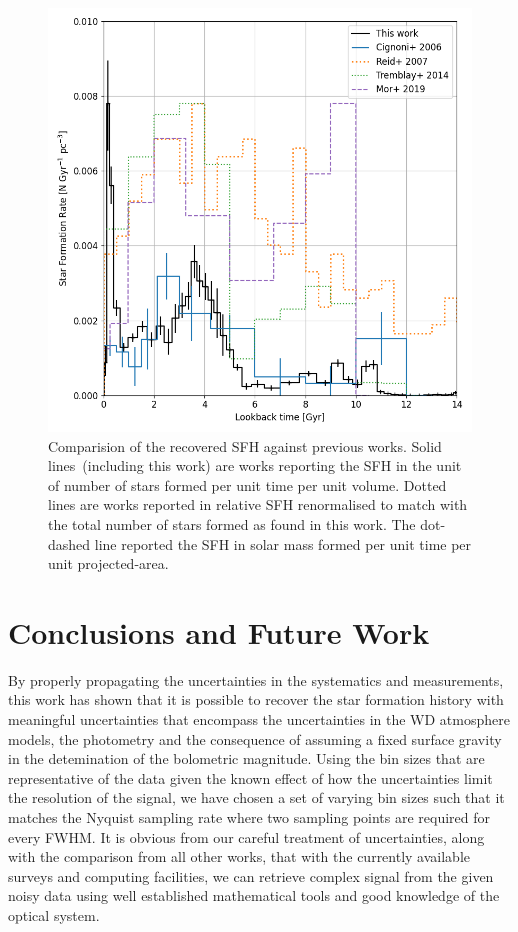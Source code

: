 \documentclass[fleqn,usenatbib]{mnras}
\begin{document}
\begin{figure}
  \includegraphics[width=\columnwidth]{figures/fig_06_compare_sfh.png}
  \caption{Comparision of the recovered SFH against previous works.
  Solid lines~(including this work)
  are works reporting the SFH in the unit of number of stars formed per
  unit time per unit volume. Dotted lines are works reported
  in relative SFH renormalised to match with the total number of stars formed
  as found in this work. The dot-dashed line reported the SFH in solar mass
  formed per unit time per unit projected-area.}
  \label{fig:comparison}
\end{figure}

\section{Conclusions and Future Work}
\label{sec:conclusion}
By properly propagating the uncertainties in the
systematics and measurements, this work has shown that it is
possible to recover the star formation history with meaningful
uncertainties that encompass the uncertainties in the WD atmosphere
models, the photometry and the consequence of assuming a fixed
surface gravity in the detemination of the bolometric magnitude.
Using the bin sizes that are representative of the data given the
known effect of how the uncertainties limit the resolution of
the signal, we have chosen a set of varying bin sizes such that
it matches the Nyquist sampling rate where two sampling points are
required for every FWHM. It is obvious from our careful treatment
of uncertainties, along with the comparison from all other
works, that with the currently available surveys and computing
facilities, we can retrieve complex signal from the given noisy
data using well established mathematical tools and good knowledge
of the optical system.
\end{document}
